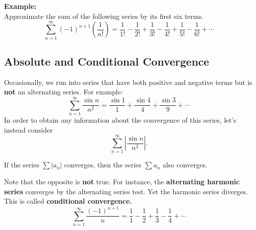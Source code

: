 \documentclass[addpoints, 12pt]{exam}
\begin{document}
\noindent\textbf{Example:}\\
Approximate the sum of the following series by its first six terms.
\[\displaystyle\sum_{n=1}^{\infty}(-1)^{n+1}\left(\frac{1}{n!}\right)=\frac{1}{1!}-\frac{1}{2!}+\frac{1}{3!}-\frac{1}{4!}+\frac{1}{5!}-\frac{1}{6!}+\cdots\]




\newpage


\subsection*{Absolute and Conditional Convergence}
Occasionally, we run into series that have both positive and negative terms but is \textbf{not} an alternating series. For example:
\[\displaystyle\sum_{n=1}^{\infty}\frac{\sin n}{n^2}=\frac{\sin1}{1}+\frac{\sin4}{4}+\frac{\sin3}{9}+\cdots\]
In order to obtain any information about the convergence of this series, let's instead consider
\[\displaystyle\sum_{n=1}^{\infty}\left|\frac{\sin n}{n^2}\right|.\]

\begin{tcolorbox}[title= ABSOLUTE CONVERGENCE,black,sharp corners,colback=white,colbacktitle=white,coltitle=black]

    If the series $\displaystyle\sum\left|a_n\right|$ converges, then the series $\displaystyle\sum a_n$ also converges.

\end{tcolorbox}
\vspace{.1in}
Note that the opposite is \textbf{not} true. For instance, the \textbf{alternating harmonic series} converges by the alternating series test. Yet the harmonic series diverges. This is called \textbf{conditional convergence.}
\[\sum_{n=1}^\infty \frac{(-1)^{n+1}}{n}=\frac{1}{1}-\frac{1}{2}+\frac{1}{3}-\frac{1}{4}+\cdots\]


\newpage
\end{document}

